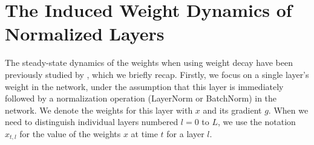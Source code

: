 \documentclass[]{fairmeta}
\begin{document}
\section{The Induced Weight Dynamics of Normalized Layers}
\label{sec:dynamics}

The steady-state dynamics of the weights when using weight decay have been previously studied by \citet{van2017l2}, which we briefly recap. Firstly, we focus on a single layer's weight in the network, under the assumption that this layer is immediately followed by a normalization operation (LayerNorm or BatchNorm) in the network. We denote the weights for this layer with $x$ and its gradient $g$. When we need to distinguish individual layers numbered $l=0$ to $L$, we use the notation $x_{t,l}$ for the value of the weights $x$ at time $t$ for a layer $l$.
\end{document}
